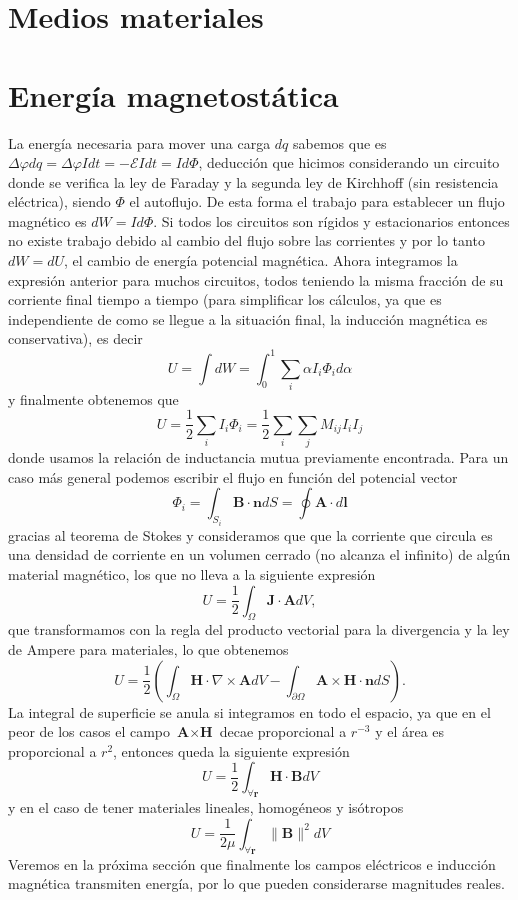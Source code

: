 \documentclass[11pt,a4paper]{article}
\numberwithin{equation}{section}
\begin{document}
\section{Medios materiales}
\label{sec:medios}


\section{Energía magnetostática}
La energía necesaria para mover una carga $dq$ sabemos que es $\Delta \varphi dq = \Delta \varphi I dt = - \mathcal{E} I dt = I d\Phi$, deducción que hicimos considerando un circuito donde se verifica la ley de Faraday y la segunda ley de Kirchhoff (sin resistencia eléctrica), siendo $\Phi$ el autoflujo. De esta forma el trabajo para establecer un flujo magnético es $dW = I d\Phi$. Si todos los circuitos son rígidos y estacionarios entonces no existe trabajo debido al cambio del flujo sobre las corrientes y por lo tanto $dW = dU$, el cambio de energía potencial magnética. Ahora integramos la expresión anterior para muchos circuitos, todos teniendo la misma fracción de su corriente final tiempo a tiempo (para simplificar los cálculos, ya que es independiente de como se llegue a la situación final, la inducción magnética es conservativa), es decir
\[U = \int dW = \int_0^1 \sum_i \alpha I_i \Phi_i d\alpha\] y finalmente obtenemos que 
\begin{equation}
    U = \frac{1}{2} \sum_i I_i \Phi_i = \frac{1}{2} \sum_i \sum_j M_{ij} I_i I_j
    \label{eq:m_energia_circuitos}
\end{equation}
donde usamos la relación de inductancia mutua previamente encontrada.
Para un caso más general podemos escribir el flujo en función del potencial vector \[\Phi_i = \int_{S_i} \textbf{B} \cdot \textbf{n} dS = \oint \textbf{A} \cdot d\textbf{l}\] gracias al teorema de Stokes y consideramos que que la corriente que circula es una densidad de corriente en un volumen cerrado (no alcanza el infinito) de algún material magnético, los que no lleva a la siguiente expresión \[U = \frac{1}{2} \int_{\Omega} \textbf{J} \cdot \textbf{A} dV,\] que transformamos con la regla del producto vectorial para la divergencia y la ley de Ampere para materiales, lo que obtenemos \[U = \frac{1}{2} \left(\int_{\Omega} \textbf{H} \cdot \nabla \times \textbf{A} dV - \int_{\partial \Omega} \textbf{A} \times \textbf{H} \cdot \textbf{n} dS\right).\] La integral de superficie se anula si integramos en todo el espacio, ya que en el peor de los casos el campo $\textbf{A} \times \textbf{H}$ decae proporcional a $r^{-3}$ y el área es proporcional a $r^2$, entonces queda la siguiente expresión
\begin{equation}
    U = \frac{1}{2} \int_{\forall \textbf{r}} \textbf{H} \cdot \textbf{B} dV
    \label{eq:m_energia_campo}
\end{equation}
y en el caso de tener materiales lineales, homogéneos y isótropos
\begin{equation}
    U = \frac{1}{2\mu} \int_{\forall \textbf{r}} \|\textbf{B}\|^2 dV
\end{equation}
Veremos en la próxima sección que finalmente los campos eléctricos e inducción magnética transmiten energía, por lo que pueden considerarse magnitudes reales.
\end{document}
